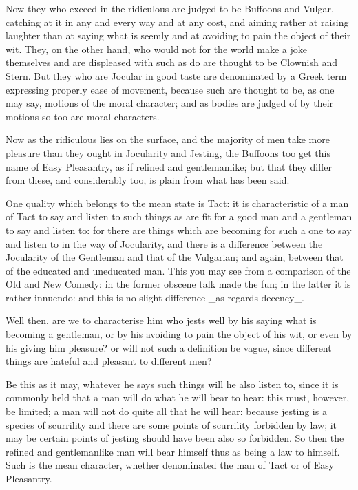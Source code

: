Now they who exceed in the ridiculous are judged to be Buffoons and
Vulgar, catching at it in any and every way and at any cost, and aiming
rather at raising laughter than at saying what is seemly and at avoiding
to pain the object of their wit. They, on the other hand, who would not
for the world make a joke themselves and are displeased with such as do
are thought to be Clownish and Stern. But they who are Jocular in good
taste are denominated by a Greek term expressing properly ease of
movement, because such are thought to be, as one may say, motions of the
moral character; and as bodies are judged of by their motions so too are
moral characters.

Now as the ridiculous lies on the surface, and the majority of men take
more pleasure than they ought in Jocularity and Jesting, the Buffoons
too get this name of Easy Pleasantry, as if refined and gentlemanlike;
but that they differ from these, and considerably too, is plain from
what has been said.

One quality which belongs to the mean state is Tact: it is
characteristic of a man of Tact to say and listen to such things as are
fit for a good man and a gentleman to say and listen to: for there are
things which are becoming for such a one to say and listen to in the way
of Jocularity, and there is a difference between the Jocularity of the
Gentleman and that of the Vulgarian; and again, between that of the
educated and uneducated man. This you may see from a comparison of the
Old and New Comedy: in the former obscene talk made the fun; in the
latter it is rather innuendo: and this is no slight difference _as
regards decency_.

Well then, are we to characterise him who jests well by his saying what
is becoming a gentleman, or by his avoiding to pain the object of his
wit, or even by his giving him pleasure? or will not such a definition
be vague, since different things are hateful and pleasant to different
men?

Be this as it may, whatever he says such things will he also listen to,
since it is commonly held that a man will do what he will bear to hear:
this must, however, be limited; a man will not do quite all that he will
hear: because jesting is a species of scurrility and there are some
points of scurrility forbidden by law; it may be certain points of
jesting should have been also so forbidden. So then the refined and
gentlemanlike man will bear himself thus as being a law to himself. Such
is the mean character, whether denominated the man of Tact or of Easy
Pleasantry.

